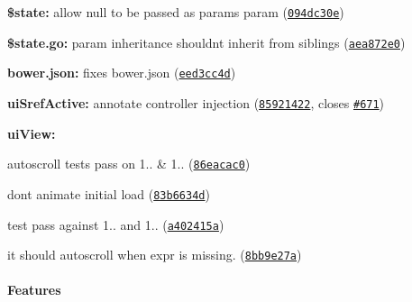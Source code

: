 {\bfseries {\bfseries {\bfseries {\bfseries {\bfseries 
\begin{DoxyItemize}
\item {\bfseries \$state\+:} allow null to be passed as \textquotesingle{}params\textquotesingle{} param (\href{https://github.com/angular-ui/ui-router/commit/094dc30e883e1bd14e50a475553bafeaade3b178}{\tt 094dc30e})
\item {\bfseries \$state.\+go\+:} param inheritance shouldn\textquotesingle{}t inherit from siblings (\href{https://github.com/angular-ui/ui-router/commit/aea872e0b983cb433436ce5875df10c838fccedb}{\tt aea872e0})
\item {\bfseries bower.\+json\+:} fixes bower.\+json (\href{https://github.com/angular-ui/ui-router/commit/eed3cc4d4dfef1d3ef84b9fd063127538ebf59d3}{\tt eed3cc4d})
\item {\bfseries ui\+Sref\+Active\+:} annotate controller injection (\href{https://github.com/angular-ui/ui-router/commit/85921422ff7fb0effed358136426d616cce3d583}{\tt 85921422}, closes \href{https://github.com/angular-ui/ui-router/issues/671}{\tt \#671})
\item {\bfseries ui\+View\+:}
\begin{DoxyItemize}
\item autoscroll tests pass on 1.. \& 1.. (\href{https://github.com/angular-ui/ui-router/commit/86eacac09ca5e9000bd3b9c7ba6e2cc95d883a3a}{\tt 86eacac0})
\item don\textquotesingle{}t animate initial load (\href{https://github.com/angular-ui/ui-router/commit/83b6634d27942ca74766b2b1244a7fc52c5643d9}{\tt 83b6634d})
\item test pass against 1.. and 1.. (\href{https://github.com/angular-ui/ui-router/commit/a402415a2a28b360c43b9fe8f4f54c540f6c33de}{\tt a402415a})
\item it should autoscroll when expr is missing. (\href{https://github.com/angular-ui/ui-router/commit/8bb9e27a2986725f45daf44c4c9f846385095aff}{\tt 8bb9e27a})
\end{DoxyItemize}
\end{DoxyItemize}}}}}}

{\bfseries {\bfseries {\bfseries {\bfseries {\bfseries \paragraph*{Features}}}}}}

{\bfseries {\bfseries {\bfseries {\bfseries {\bfseries }}}}}

